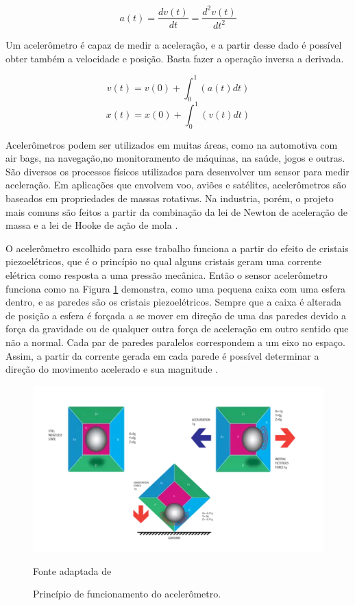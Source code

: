				\begin{equation}
				a(t) = \frac{dv(t)}{dt} = \frac{d^2v(t)}{dt^2} 
				\end{equation}
				
				Um acelerômetro é capaz de medir a aceleração, e a partir desse dado é possível obter também a velocidade e posição. Basta fazer a operação inversa a derivada\cite{moyses2013}.
				
				\begin{equation}
				v(t) = v(0) + \int_{0}^{1}(a(t)dt)
				\end{equation}
				\begin{equation}
				x(t) = x(0) + \int_{0}^{1}(v(t)dt)
				\end{equation}
				
				Acelerômetros podem ser utilizados em muitas áreas, como na  automotiva com air bags, na navegação,no monitoramento de máquinas, na saúde, jogos e outras. São diversos os processos físicos utilizados para desenvolver um sensor para
				medir aceleração. Em aplicações que envolvem voo, aviões e satélites,
				acelerômetros são baseados em propriedades de massas rotativas. Na industria,
				porém, o projeto mais comuns são feitos a partir da combinação da lei de Newton de
				aceleração de massa e a lei de Hooke de ação de mola \cite{carneiro2003}.
				
				O acelerômetro escolhido para esse trabalho funciona a partir do efeito de cristais piezoelétricos, que é o princípio no qual alguns cristais geram uma corrente elétrica como resposta a uma pressão mecânica. Então o sensor acelerômetro  funciona como na Figura \ref{acel} demonstra, como uma pequena caixa com uma esfera dentro, e as paredes são os cristais piezoelétricos.  Sempre que a caixa é alterada de posição a esfera é forçada a se mover em direção de uma das paredes devido a força da gravidade ou de qualquer outra força de aceleração em outro sentido que não a normal. Cada par de paredes paralelos correspondem a um eixo no espaço. Assim, a partir da corrente gerada em cada parede é possível determinar a direção do movimento acelerado e sua magnitude \cite{Sanjeev2018}.
				
				\begin{figure}[h]
					\centering
					\includegraphics[keepaspectratio=true,scale=0.8
					]{figuras/acelerometro.PNG}
					\caption{Princípio de funcionamento do acelerômetro.}
					Fonte adaptada de \cite{Sanjeev2018}
					\label{acel}
				\end{figure}
	

